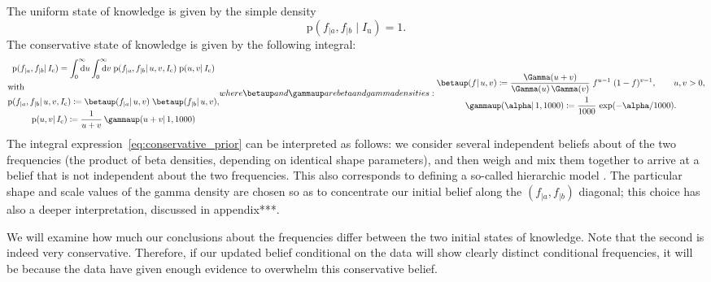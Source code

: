 \documentclass[\ifafour a4paper,12pt,\else a5paper,10pt,\fi%
onecolumn,oneside,article,%
british%
]{memoir}
\theoremstyle{remark}
\theoremstyle{innote}
\newcommand*{\citep}{\parencites}
\newcommand*{\di}{\mathrm{d}}%
\newcommand*{\defd}{\coloneqq}
\newcommand*{\pf}{\mathrm{p}}%
\renewcommand*{\|}{\mathpunct{|}}
\newcommand*{\yI}{I}
\newcommand*{\yIu}{\yI_\text{u}}
\newcommand*{\yIc}{\yI_\text{c}}
\newcommand*{\ya}{a}
\newcommand*{\yb}{b}
\newcommand*{\dbeta}{\betaup}
\newcommand*{\dgamma}{\gammaup}
\newcommand*{\yA}{\alpha}
\newcommand*{\yua}{u}
\newcommand*{\yub}{v}
\begin{document}
The uniform state of knowledge is given by the simple density
\begin{equation}
  \label{eq:uniform_prior}
  \pf(f_{|\ya}, f_{|\yb} \| \yIu)%
  =1.%
\end{equation}
The conservative state of knowledge is given by the following integral:
\begin{subequations}
  \label{eq:conservative_prior}
  \begin{gather}
    \pf(f_{|\ya}, f_{|\yb} \| \yIc)%
    =
    \int_{\mathrlap{0}}^{\mathrlap{\infty}}\di\yua
    \int_{\mathrlap{0}}^{\mathrlap{\infty}}\di\yub\;
    \pf(f_{|\ya}, f_{|\yb} \| \yua,\yub,\yIc)\;
    \pf(\yua,\yub \| \yIc)%
    \\
    \shortintertext{with}
    \label{eq:beta_product}
    \pf(f_{|\ya}, f_{|\yb} \| \yua,\yub,\yIc)\defd
    \dbeta(f_{|\ya} \| \yua,\yub)\;
    \dbeta(f_{|\yb} \| \yua,\yub),
    \\
    \label{eq:p_initial_parameters}
    \pf(\yua,\yub \| \yIc)\defd \frac{1}{u+v}\,\dgamma(u+v \| 1, 1000)
  \end{gather}
  where $\dbeta$ and $\dgamma$ are beta and gamma densities:
  \begin{gather}
    \label{eq:def_beta}
    \dbeta(f \| \yua,\yub) \defd
    \frac{\Gamma(\yua+\yub)}{\Gamma(\yua)\,\Gamma(\yub)}\;
    f^{\yua-1}\;(1-f)^{\yub-1},
    \qquad  \yua,\yub>0,
    \\
    \label{eq:def_gamma}
    \dgamma(\yA \| 1, 1000) \defd
    \frac{1}{1000}\,\exp(-\yA/1000).
  \end{gather}
\end{subequations}
The integral expression~\eqref{eq:conservative_prior} can be interpreted as
follows: we consider several independent beliefs about of the two
frequencies (the product of beta densities, depending on identical shape
parameters), and then weigh and mix them together to arrive at a belief
that is not independent about the two frequencies. This also corresponds to
defining a so-called hierarchic model \citep{good1980}. The particular
shape and scale values of the gamma density are chosen so as to concentrate
our initial belief along the $(f_{|\ya}, f_{|\yb})$ diagonal; this choice
has also a deeper interpretation, discussed in appendix***.

\medskip

We will examine how much our conclusions about the frequencies differ
between the two initial states of knowledge. Note that the second is indeed
very conservative. Therefore, if our updated belief conditional on the data
will show clearly distinct conditional frequencies, it will be because the
data have given enough evidence to overwhelm this conservative belief.
\end{document}
